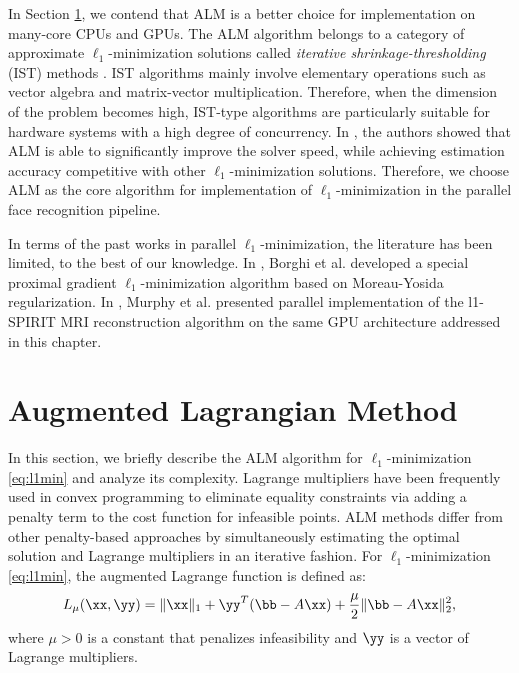 

In Section \ref{sec:ALM}, we contend that ALM is a better choice for
implementation on many-core CPUs and GPUs. The ALM algorithm belongs to a
category of approximate $\ell_1$-minimization solutions called \emph{iterative
shrinkage-thresholding} (IST) methods \cite{WrightS2008,BeckA2009}.  IST
algorithms mainly involve elementary operations such as vector algebra and
matrix-vector multiplication. Therefore, when the dimension of the problem
becomes high, IST-type algorithms are particularly suitable for hardware
systems with a high degree of concurrency. In \cite{YangA2010-ICIP}, the
authors showed that ALM is able to significantly improve the solver speed,
while achieving estimation accuracy competitive with other $\ell_1$-minimization
solutions. Therefore, we choose ALM as the core algorithm for
implementation of $\ell_1$-minimization in the parallel face recognition pipeline.

In terms of the past works in parallel $\ell_1$-minimization, the literature has been
limited, to the best of our knowledge. In \cite{BorghiA2010}, Borghi et al.
developed a special proximal gradient $\ell_1$-minimization algorithm based on
Moreau-Yosida regularization. In \cite{MurphyM2010}, Murphy et al. presented
parallel implementation of the l1-SPIRIT MRI reconstruction algorithm on 
the same GPU architecture addressed in this chapter.

\section{Augmented Lagrangian Method}
\label{sec:ALM}
In this section, we briefly describe the ALM algorithm for $\ell_1$-minimization
\eqref{eq:l1min} \cite{YangA2010-ICIP} and analyze its complexity. Lagrange
multipliers have been frequently used in convex programming to eliminate
equality constraints via adding a penalty term to the cost function for
infeasible points. ALM methods differ from other penalty-based approaches by
simultaneously estimating the optimal solution and Lagrange multipliers in an
iterative fashion.  For $\ell_1$-minimization \eqref{eq:l1min}, the augmented Lagrange
function is defined as: 
\begin{equation} L_\mu(\xx,\yy) = \|\xx\|_1 +
\yy^T(\bb - A\xx) + \frac{\mu}{2} \| \bb-A\xx \|_2^2, 
\end{equation}
where $\mu > 0$ is a constant that penalizes infeasibility and $\yy$ is a
vector of Lagrange multipliers.

